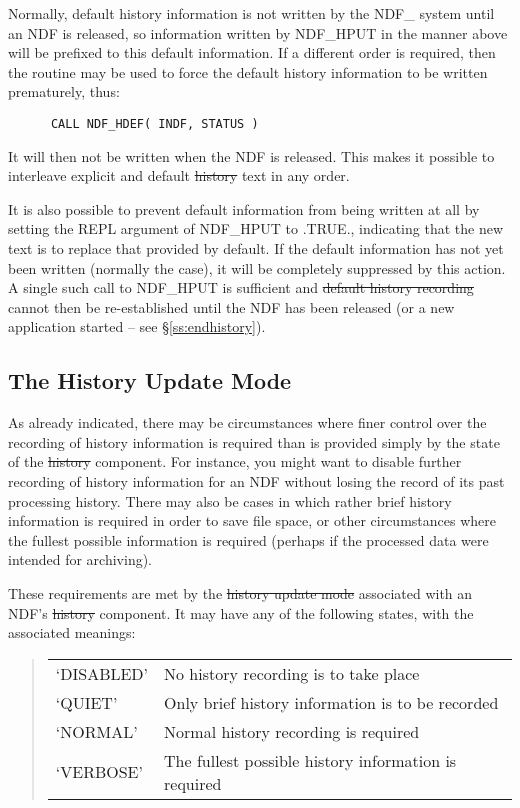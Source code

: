 Normally, default history information is not written by the NDF\_
system until an NDF is released, so information written by NDF\_HPUT
in the manner above will be prefixed to this default information. If a
different order is required, then the routine  may be used to
force the default history information to be written prematurely, thus:

\small
\begin{verbatim}
      CALL NDF_HDEF( INDF, STATUS )
\end{verbatim}
\normalsize

It will then not be written when the NDF is released. This makes it
possible to interleave explicit and default \st{history\/} text in any order.

It is also possible to prevent default information from being written
at all by setting the REPL argument of NDF\_HPUT to .TRUE., indicating
that the new text is to replace that provided by default. If the
default information has not yet been written (normally the case), it
will be completely suppressed by this action. A single such call to
NDF\_HPUT is sufficient and \st{default history recording\/} cannot then be
re-established until the NDF has been released (or a new application
started -- see \S\ref{ss:endhistory}).

\subsection{\label{ss:historyupdatemode}The History Update Mode}

As already indicated, there may be circumstances where finer control
over the recording of history information is required than is provided
simply by the state of the \st{history\/} component. For instance, you
might want to disable further recording of history information for an
NDF without losing the record of its past processing history. There
may also be cases in which rather brief history information is
required in order to save file space, or other circumstances where the
fullest possible information is required (perhaps if the processed
data were intended for archiving).

These requirements are met by the \st{history update mode\/} associated
with an NDF's \st{history\/} component. It may have any of the
following states, with the associated meanings:

\begin{quote}
\begin{center}
\begin{tabular}{ll}
`DISABLED' & No history recording is to take place\\
`QUIET' & Only brief history information is to be recorded\\
`NORMAL' & Normal history recording is required\\
`VERBOSE' & The fullest possible history information is required
\end{tabular}
\end{center}
\end{quote}

